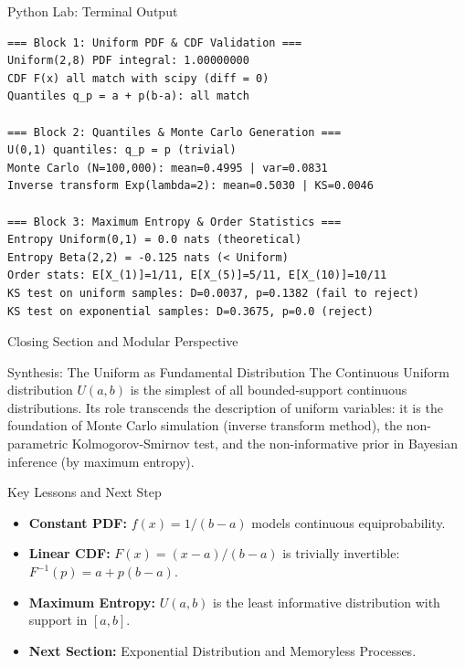 \documentclass[aspectratio=169,xcolor={dvipsnames,table}]{beamer}
\begin{document}
\begin{frame}[fragile]{Python Lab: Terminal Output}
	\vspace{-0.1cm}
	\begin{block}{}
		\fontsize{4pt}{5pt}\selectfont
		\begin{verbatim}
=== Block 1: Uniform PDF & CDF Validation ===
Uniform(2,8) PDF integral: 1.00000000
CDF F(x) all match with scipy (diff = 0)
Quantiles q_p = a + p(b-a): all match

=== Block 2: Quantiles & Monte Carlo Generation ===
U(0,1) quantiles: q_p = p (trivial)
Monte Carlo (N=100,000): mean=0.4995 | var=0.0831
Inverse transform Exp(lambda=2): mean=0.5030 | KS=0.0046

=== Block 3: Maximum Entropy & Order Statistics ===
Entropy Uniform(0,1) = 0.0 nats (theoretical)
Entropy Beta(2,2) = -0.125 nats (< Uniform)
Order stats: E[X_(1)]=1/11, E[X_(5)]=5/11, E[X_(10)]=10/11
KS test on uniform samples: D=0.0037, p=0.1382 (fail to reject)
KS test on exponential samples: D=0.3675, p=0.0 (reject)
		\end{verbatim}
	\end{block}
\end{frame}









\begin{frame}{Closing Section and Modular Perspective}
	\vspace{-0.2cm}
	\begin{block}{Synthesis: The Uniform as Fundamental Distribution}
		\scriptsize
		The Continuous Uniform distribution $U(a, b)$ is the simplest of all bounded-support continuous distributions. Its role transcends the description of uniform variables: it is the foundation of Monte Carlo simulation (inverse transform method), the non-parametric Kolmogorov-Smirnov test, and the non-informative prior in Bayesian inference (by maximum entropy).
	\end{block}
	\vspace{0.05cm}
	\pause
	\begin{alertblock}{Key Lessons and Next Step}
		\begin{itemize}\itemsep=0.05cm
			\item \textbf{Constant PDF:} $f(x) = 1/(b-a)$ models continuous equiprobability.
			\item \textbf{Linear CDF:} $F(x) = (x-a)/(b-a)$ is trivially invertible: $F^{-1}(p) = a + p(b-a)$.
			\item \textbf{Maximum Entropy:} $U(a, b)$ is the least informative distribution with support in $[a, b]$.
			\item \textbf{Next Section:} \textcolor{TecRojo}{Exponential Distribution and Memoryless Processes}.
		\end{itemize}
	\end{alertblock}
\end{frame}
\end{document}
